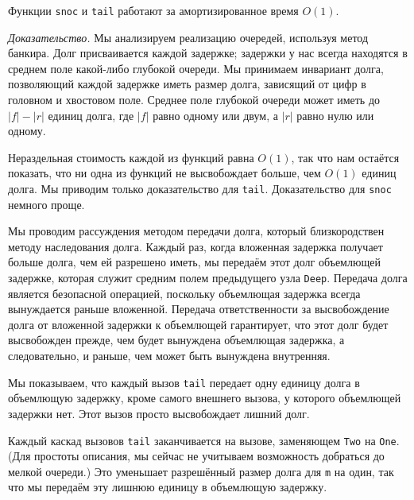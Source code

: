 \begin{theorem}\label{th:11.1}
  Функции \lstinline!snoc! и \lstinline!tail! работают за
  амортизированное время $O(1)$.

  \noindent
  \emph{Доказательство.} Мы анализируем реализацию очередей, используя
  метод банкира. Долг присваивается каждой задержке; задержки у нас
  всегда находятся в среднем поле какой-либо глубокой очереди.  Мы
  принимаем инвариант долга, позволяющий каждой задержке иметь размер
  долга, зависящий от цифр в головном и хвостовом поле. Среднее поле
  глубокой очереди может иметь до $|f| - |r|$ единиц долга, где $|f|$
  равно одному или двум, а $|r|$ равно нулю или одному.

  Нераздельная стоимость каждой из функций равна $O(1)$, так что нам
  остаётся показать, что ни одна из функций не высвобождает больше,
  чем $O(1)$ единиц долга. Мы приводим только доказательство для
  \lstinline!tail!. Доказательство для \lstinline!snoc! немного проще.

  Мы проводим рассуждения методом передачи долга, который
  близкородствен методу наследования долга.  Каждый раз, когда
  вложенная задержка получает больше долга, чем ей разрешено иметь, мы
  передаём этот долг объемлющей задержке, которая служит средним полем
  предыдущего узла \lstinline!Deep!. Передача долга является
  безопасной операцией, поскольку объемлющая задержка всегда
  вынуждается раньше вложенной.  Передача ответственности за
  высвобождение долга от вложенной задержки к объемлющей гарантирует,
  что этот долг будет высвобожден прежде, чем будет вынуждена
  объемлющая задержка, а следовательно, и раньше, чем может быть вынуждена
  внутренняя.

  Мы показываем, что каждый вызов \lstinline!tail! передает одну
  единицу долга в объемлющую задержку, кроме самого внешнего вызова, у
  которого объемлющей задержки нет. Этот вызов просто высвобождает
  лишний долг.

  Каждый каскад вызовов \lstinline!tail! заканчивается на вызове,
  заменяющем \lstinline!Two! на
  \lstinline!One!. (Для простоты описания, мы сейчас не учитываем
  возможность добраться до мелкой очереди.) Это уменьшает разрешённый
  размер долга для \lstinline!m! на один, так что мы передаём эту
  лишнюю единицу в объемлющую задержку.


\end{theorem}
